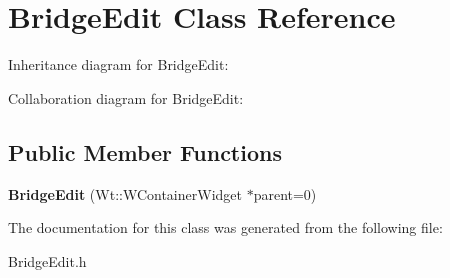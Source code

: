 \hypertarget{classBridgeEdit}{}\section{Bridge\+Edit Class Reference}
\label{classBridgeEdit}


Inheritance diagram for Bridge\+Edit\+:


Collaboration diagram for Bridge\+Edit\+:
\subsection*{Public Member Functions}
\begin{DoxyCompactItemize}
\item 
\mbox{\label{classBridgeEdit_ad2d323dda4aab3f807cf79c7185e1e68}} 
{\bfseries Bridge\+Edit} (Wt\+::\+W\+Container\+Widget $\ast$parent=0)
\end{DoxyCompactItemize}


The documentation for this class was generated from the following file\+:\begin{DoxyCompactItemize}
\item 
Bridge\+Edit.\+h\end{DoxyCompactItemize}
